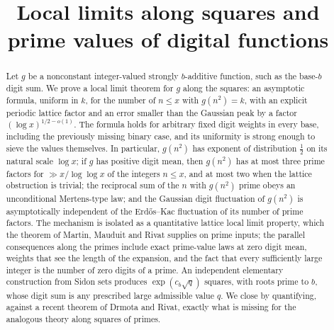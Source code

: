 \documentclass[11pt,reqno]{amsart}
\theoremstyle{plain}
\theoremstyle{definition}
\newcommand{\1}{\mathbf 1}
\begin{document}
\title[Local limits along squares and prime values]{Local limits along squares and prime values of digital functions}


\date{}


\begin{abstract}
Let $g$ be a nonconstant integer-valued strongly $b$-additive function, such as the base-$b$ digit sum. We prove a local limit theorem for $g$ along the squares: an asymptotic formula, uniform in $k$, for the number of $n\le x$ with $g(n^2)=k$, with an explicit periodic lattice factor and an error smaller than the Gaussian peak by a factor $(\log x)^{1/2-o(1)}$. The formula holds for arbitrary fixed digit weights in every base, including the previously missing binary case, and its uniformity is strong enough to sieve the values themselves. In particular, $g(n^2)$ has exponent of distribution $\tfrac12$ on its natural scale $\log x$; if $g$ has positive digit mean, then $g(n^2)$ has at most three prime factors for $\gg x/\log\log x$ of the integers $n\le x$, and at most two when the lattice obstruction is trivial; the reciprocal sum of the $n$ with $g(n^2)$ prime obeys an unconditional Mertens-type law; and the Gaussian digit fluctuation of $g(n^2)$ is asymptotically independent of the Erd\H{o}s--Kac fluctuation of its number of prime factors. The mechanism is isolated as a quantitative lattice local limit property, which the theorem of Martin, Mauduit and Rivat supplies on prime inputs; the parallel consequences along the primes include exact prime-value laws at zero digit mean, weights that see the length of the expansion, and the fact that every sufficiently large integer is the number of zero digits of a prime. An independent elementary construction from Sidon sets produces $\exp(c_b\sqrt q)$ squares, with roots prime to $b$, whose digit sum is any prescribed large admissible value $q$. We close by quantifying, against a recent theorem of Drmota and Rivat, exactly what is missing for the analogous theory along squares of primes.
\end{abstract}

\maketitle
\end{document}
